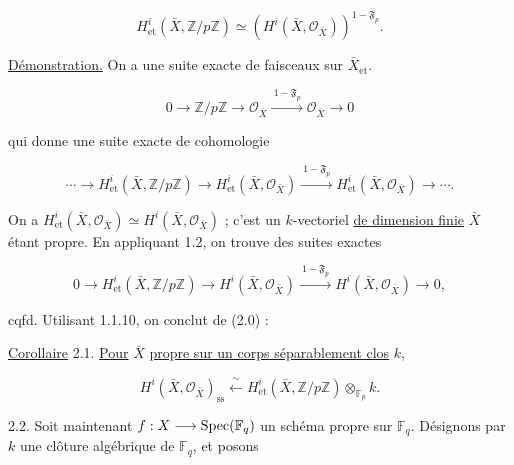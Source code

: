 \begin{equation}\tag{2.0.3}
H^i_{\mathrm{et}}(\bar X,\mathbb Z/p\mathbb Z)
\simeq
(H^i(\bar X,\mathcal O_{\bar X}))^{1-\overline{\mathfrak F}_p}.
\end{equation}

\underline{Démonstration.} On a une suite exacte de faisceaux sur
$\bar X_{\mathrm{et}}$.

\begin{equation}\tag{2.0.4}
0\longrightarrow\mathbb Z/p\mathbb Z\longrightarrow\mathcal O_{\bar X}
\xrightarrow{\ 1-\mathfrak F_p\ }\mathcal O_{\bar X}\longrightarrow0
\end{equation}

qui donne une suite exacte de cohomologie

\begin{equation}\tag{2.0.5}
\cdots\longrightarrow H^i_{\mathrm{et}}(\bar X,\mathbb Z/p\mathbb Z)
\longrightarrow H^i_{\mathrm{et}}(\bar X,\mathcal O_{\bar X})
\xrightarrow{\ 1-\mathfrak F_p\ }
H^i_{\mathrm{et}}(\bar X,\mathcal O_{\bar X})\longrightarrow\cdots .
\end{equation}

On a
$H^i_{\mathrm{et}}(\bar X,\mathcal O_{\bar X})\simeq
H^i(\bar X,\mathcal O_{\bar X})$ ; c'est un $k$-vectoriel \underline{de dimension finie}
$\bar X$ étant propre. En appliquant 1.2, on trouve des suites exactes


\begin{equation}\tag{2.0.6}
0\longrightarrow H^i_{\mathrm{et}}(\bar X,\mathbb Z/p\mathbb Z)
\longrightarrow H^i(\bar X,\mathcal O_{\bar X})
\xrightarrow{\ 1-\mathfrak F_p\ }
H^i(\bar X,\mathcal O_{\bar X})\longrightarrow0,
\end{equation}

cqfd. Utilisant 1.1.10, on conclut de (2.0) :

\underline{Corollaire} 2.1. \underline{Pour} $\bar X$ \underline{propre sur un corps
séparablement clos} $k$,

\begin{equation}\tag{2.1.1}
H^i(\bar X,\mathcal O_{\bar X})_{\mathrm{ss}}
\xleftarrow{\ \sim\ }
H^i_{\mathrm{et}}(\bar X,\mathbb Z/p\mathbb Z)
\otimes_{\mathbb F_p}k.
\end{equation}

2.2. Soit maintenant $f:X\longrightarrow\operatorname{Spec}(\mathbb F_q)$ un schéma
propre sur $\mathbb F_q$. Désignons par $k$ une clôture algébrique de
$\mathbb F_q$, et posons

